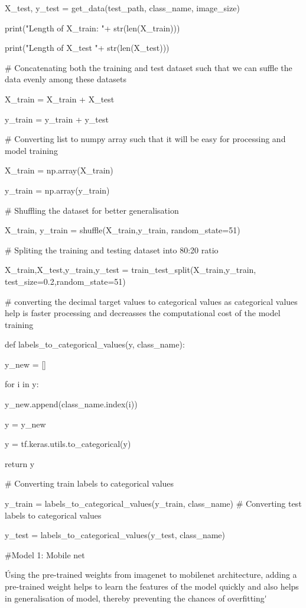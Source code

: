 \documentclass[12pt, a4paper,twoside]{report}
\theoremstyle{plain} %
\theoremstyle{definition} %
\theoremstyle{remark} %
\numberwithin{equation}{chapter}
\begin{document}
X\_test, y\_test = get\_data(test\_path, class\_name, image\_size)

print("Length of X\_train: "+ str(len(X\_train)))

print("Length of X\_test "+ str(len(X\_test)))

\# Concatenating both the training and test dataset such that we can suffle the data evenly among these datasets

X\_train = X\_train + X\_test

y\_train = y\_train + y\_test

\# Converting list to numpy array such that it will be easy for processing and model training

X\_train = np.array(X\_train)

y\_train = np.array(y\_train)

\# Shuffling the dataset for better generalisation

X\_train, y\_train = shuffle(X\_train,y\_train, random\_state=51)

\# Spliting the training and testing dataset into 80:20 ratio

X\_train,X\_test,y\_train,y\_test = train\_test\_split(X\_train,y\_train, test\_size=0.2,random\_state=51)

\# converting the decimal target values to categorical values as categorical values help is faster processing and decreasses the computational cost of the model training

def labels\_to\_categorical\_values(y, class\_name):
 
  y\_new = []
  
  for i in y:
  
      y\_new.append(class\_name.index(i))
  
  y = y\_new
  
  y = tf.keras.utils.to\_categorical(y)
  
  return y

\# Converting train labels to categorical values

y\_train = labels\_to\_categorical\_values(y\_train, class\_name)
\# Converting test labels to categorical values

y\_test = labels\_to\_categorical\_values(y\_test, class\_name)

\#Model 1: Mobile net

\'Using the pre-trained weights from imagenet to mobilenet architecture, adding a pre-trained weight
helps to learn the features of the model quickly and also helps in generalisation of model,
thereby preventing the chances of overfitting\'
\end{document}
